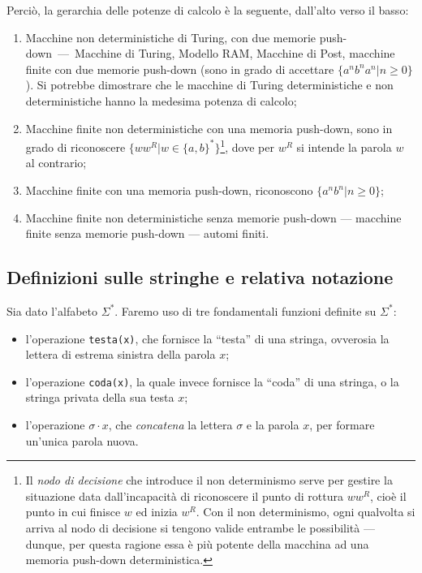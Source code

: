 \documentclass[10pt]{\classname}
\theoremstyle{newlinethm}
\theoremstyle{theorem}
\theoremstyle{definition}
\theoremstyle{definition}
\theoremstyle{definition}
\theoremstyle{definition}
\begin{document}
Perciò, la gerarchia delle potenze di calcolo è la seguente, dall'alto verso il basso:
\begin{enumerate}
    \item Macchine non deterministiche di Turing, con due memorie
        push-down~---~Macchine di Turing, Modello RAM, Macchine di Post,
        macchine finite con due memorie push-down (sono in grado di accettare
        $\{a^n b^n a^n| n \geq 0\}$). Si potrebbe dimostrare che le macchine di
        Turing deterministiche e non deterministiche hanno la medesima potenza
        di calcolo;
    \item Macchine finite non deterministiche con una memoria push-down, sono
        in grado di riconoscere $\{w w^R | w\in\{a,b\}^*\}$\footnote{Il
        \emph{nodo di decisione} che introduce il non determinismo serve per
    gestire la situazione data dall'incapacità di riconoscere il punto di
rottura $ww^R$, cioè il punto in cui finisce $w$ ed inizia $w^R$. Con il non
determinismo, ogni qualvolta si arriva al nodo di decisione si tengono valide
entrambe le possibilità --- dunque, per questa ragione essa è più potente della
macchina ad una memoria push-down deterministica.}, dove per $w^R$ si intende
la parola $w$ al contrario;
    \item Macchine finite con una memoria push-down, riconoscono $\{a^n
        b^n|n\geq 0\}$;
    \item Macchine finite non deterministiche senza memorie push-down ---
        macchine finite senza memorie push-down --- automi finiti.
\end{enumerate}


\subsection{Definizioni sulle stringhe e relativa notazione}

Sia dato l'alfabeto $\Sigma^*$. Faremo uso di tre fondamentali funzioni
definite su $\Sigma^*$:
\begin{itemize}
    \item l'operazione \texttt{testa(x)}, che fornisce la ``testa'' di una stringa,
        ovverosia la lettera di estrema sinistra della parola $x$;
    \item l'operazione \texttt{coda(x)}, la quale invece fornisce la ``coda'' di una
        stringa, o la stringa privata della sua testa $x$;
    \item l'operazione $\sigma \cdot x$, che \emph{concatena} la lettera
        $\sigma$ e la parola $x$, per formare un'unica parola nuova.
\end{itemize}
\end{document}
